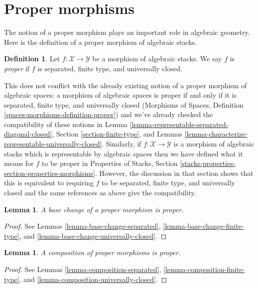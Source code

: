 \documentclass{stacks-project}
\theoremstyle{plain}
\newtheorem{lemma}[subsection]{Lemma}
\theoremstyle{definition}
\newtheorem{definition}[subsection]{Definition}
\theoremstyle{remark}
\numberwithin{equation}{subsection}
\begin{document}
\section{Proper morphisms}
\label{section-proper}

\noindent
The notion of a proper morphism plays an important role in algebraic geometry.
Here is the definition of a proper morphism of algebraic stacks.

\begin{definition}
\label{definition-proper}
Let $f : \mathcal{X} \to \mathcal{Y}$
be a morphism of algebraic stacks.
We say $f$ is {\it proper} if $f$ is separated, finite type, and
universally closed.
\end{definition}

\noindent
This does not conflict with the already existing notion of a proper morphism
of algebraic spaces: a morphism of algebraic spaces is proper if and only if
it is separated, finite type, and universally closed
(Morphisms of Spaces, Definition \ref{spaces-morphisms-definition-proper})
and we've already checked the compatibility of these notions in
Lemma \ref{lemma-representable-separated-diagonal-closed},
Section \ref{section-finite-type}, and
Lemmas \ref{lemma-characterize-representable-universally-closed}.
Similarly, if $f : \mathcal{X} \to \mathcal{Y}$ is a
morphism of algebraic stacks which is representable by algebraic spaces
then we have defined what it means for $f$ to be proper in
Properties of Stacks, Section
\ref{stacks-properties-section-properties-morphisms}.
However, the discussion in that section shows that this is
equivalent to requiring $f$ to be separated, finite type, and
universally closed and the same references as above give the
compatibility.

\begin{lemma}
\label{lemma-base-change-proper}
A base change of a proper morphism is proper.
\end{lemma}

\begin{proof}
See
Lemmas \ref{lemma-base-change-separated},
\ref{lemma-base-change-finite-type}, and
\ref{lemma-base-change-universally-closed}.
\end{proof}

\begin{lemma}
\label{lemma-composition-proper}
A composition of proper morphisms is proper.
\end{lemma}

\begin{proof}
See
Lemmas \ref{lemma-composition-separated},
\ref{lemma-composition-finite-type}, and
\ref{lemma-composition-universally-closed}.
\end{proof}
\end{document}

